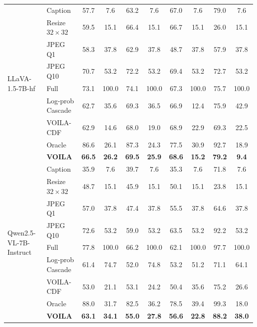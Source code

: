 \begin{table}[htbp]
{\begin{tabular}{llcccccccc}
\multirow{9}{*}{LLaVA-1.5-7B-hf}
& Caption              & 57.7 & 7.6   & 63.2 & 7.6   & 67.0 & 7.6   & 79.0 & 7.6   \\
& Resize $32{\times}32$& 59.5 & 15.1  & 66.4 & 15.1  & 66.7 & 15.1  & 26.0 & 15.1  \\
& JPEG Q1              & 58.3 & 37.8  & 62.9 & 37.8  & 48.7 & 37.8  & 57.9 & 37.8  \\
& JPEG Q10             & 70.7 & 53.2  & 72.2 & 53.2  & 69.4 & 53.2  & 72.7 & 53.2  \\
& Full                 & 73.1 & 100.0 & 74.1 & 100.0 & 67.3 & 100.0 & 75.7 & 100.0 \\
& Log-prob Cascade     & 62.7 & 35.6  & 69.3 & 36.5  & 66.9 & 12.4  & 75.9 & 42.9  \\
& \textsc{VOILA}-CDF   & 62.9 & 14.6  & 68.0 & 19.0  & 68.9 & 22.9  & 69.3 & 22.5  \\
& Oracle               & 86.6 & 26.1  & 87.3 & 24.3  & 77.5 & 30.9  & 92.7 & 18.9  \\
& \textbf{\textsc{VOILA}} & \textbf{66.5} & \textbf{26.2} & \textbf{69.5} & \textbf{25.9} & \textbf{68.6} & \textbf{15.2} & \textbf{79.2} & \textbf{9.4} \\
\midrule

\multirow{9}{*}{Qwen2.5-VL-7B-Instruct}
& Caption              & 35.9 & 7.6   & 39.7 & 7.6   & 35.3 & 7.6   & 71.8 & 7.6   \\
& Resize $32{\times}32$& 48.7 & 15.1  & 45.9 & 15.1  & 50.1 & 15.1  & 23.8 & 15.1  \\
& JPEG Q1              & 57.0 & 37.8  & 47.4 & 37.8  & 55.5 & 37.8  & 64.6 & 37.8  \\
& JPEG Q10             & 72.6 & 53.2  & 59.0 & 53.2  & 63.5 & 53.2  & 92.2 & 53.2  \\
& Full                 & 77.8 & 100.0 & 66.2 & 100.0 & 62.1 & 100.0 & 97.7 & 100.0 \\
& Log-prob Cascade     & 61.4 & 74.7  & 52.0 & 74.8  & 53.2 & 51.2  & 71.1 & 64.1  \\
& \textsc{VOILA}-CDF   & 53.0 & 21.1  & 53.1 & 24.2  & 50.4 & 35.6  & 75.2 & 26.6  \\
& Oracle               & 88.0 & 31.7  & 82.5 & 36.2  & 78.5 & 39.4  & 99.3 & 18.0  \\
& \textbf{\textsc{VOILA}} & \textbf{63.1} & \textbf{34.1} & \textbf{55.0} & \textbf{27.8} & \textbf{56.6} & \textbf{22.8} & \textbf{88.2} & \textbf{38.0} \\
\midrule


\end{tabular}}
\end{table}

